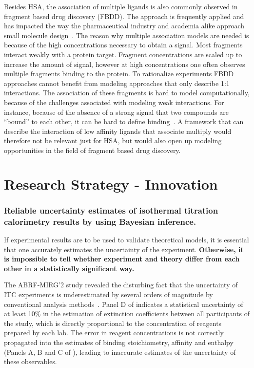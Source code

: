 \documentclass[10pt,final]{article}
\newif\ifinstr
\newcommand{\instr}[1]{\ifdraft{\ifinstr {\color{cyan}\emph{#1}} \fi}{}}
\begin{document}
Besides HSA, the association of multiple ligands is also commonly observed in fragment based drug discovery (FBDD). 
%
The approach is frequently applied and has impacted the way the pharmaceutical industry and academia alike approach small molecule design~\autocite{Hajduk2007a}.
%
The reason why multiple association models are needed is because of the high concentrations necessary to obtain a signal.
%
Most fragments interact weakly with a protein target. 
%
Fragment concentrations are scaled up to increase the amount of signal, however at high concentrations one often observes multiple fragments binding to the protein.
%
To rationalize experiments FBDD approaches cannot benefit from modeling approaches  that only describe 1:1 interactions.
%
The association of these fragments is hard to model computationally, because of the challenges associated with modeling weak interactions.
%
For instance, because of the absence of a strong signal that two compounds are ``bound'' to each other, it can be hard to define binding~\autocite{Gilson1997a}.
%
A framework that can describe the interaction of low affinity ligands that associate multiply would therefore not be relevant just for HSA, but would also open up modeling opportunities in the field of fragment based drug discovery.


\section*{Research Strategy - Innovation}
\instr{Explain how your proposal differs from what others have tried.}
\subsubsection*{Reliable uncertainty estimates of isothermal titration calorimetry results by using Bayesian inference.}
If experimental results are to be used to validate theoretical models, it is essential that one accurately estimates the uncertainty of the experiment. 
%
\textbf{Otherwise, it is impossible to tell whether experiment and theory differ from each other in a statistically significant way.}

The ABRF-MIRG'2 study revealed the disturbing fact that the uncertainty of ITC experiments is underestimated by several orders of magnitude by conventional analysis methods~\autocite{Myszka2003a}.
%
Panel D of  indicates a statistical uncertainty of at least 10\% in the estimation of extinction coefficients between all participants of the study, which is directly proportional to the concentration of reagents prepared by each lab. 
%
The error in reagent concentrations is not correctly propagated into the estimates of binding stoichiometry, affinity and enthalpy  (Panels A, B and C of ), leading to inaccurate estimates of the uncertainty of these observables.
\end{document}
